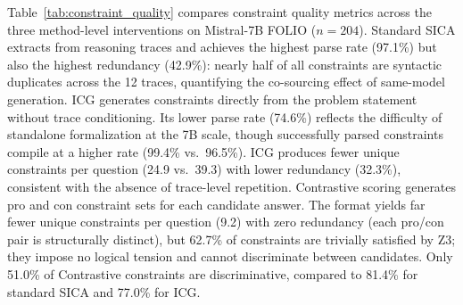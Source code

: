 Table~\ref{tab:constraint_quality} compares constraint quality metrics across the three method-level interventions on Mistral-7B FOLIO ($n = 204$). Standard SICA extracts from reasoning traces and achieves the highest parse rate (97.1\%) but also the highest redundancy (42.9\%): nearly half of all constraints are syntactic duplicates across the 12 traces, quantifying the co-sourcing effect of same-model generation. ICG generates constraints directly from the problem statement without trace conditioning. Its lower parse rate (74.6\%) reflects the difficulty of standalone formalization at the 7B scale, though successfully parsed constraints compile at a higher rate (99.4\% vs.\ 96.5\%). ICG produces fewer unique constraints per question (24.9 vs.\ 39.3) with lower redundancy (32.3\%), consistent with the absence of trace-level repetition. Contrastive scoring generates pro and con constraint sets for each candidate answer. The format yields far fewer unique constraints per question (9.2) with zero redundancy (each pro/con pair is structurally distinct), but 62.7\% of constraints are trivially satisfied by Z3; they impose no logical tension and cannot discriminate between candidates. Only 51.0\% of Contrastive constraints are discriminative, compared to 81.4\% for standard SICA and 77.0\% for ICG.

\begin{table}[h]
\centering
\small
\caption{Constraint quality metrics across method-level interventions (Mistral-7B, FOLIO, $n = 204$). Parse: fraction of extraction attempts yielding valid JSON. Z3 Compile: fraction compiling to Z3 formulas. Unique/q: mean unique constraints per question. Redundancy: fraction of constraints duplicated across traces. Disc.: fraction discriminative (different Z3 outcome per candidate). Triv.\ Sat.: fraction trivially satisfied (no logical tension).}
\label{tab:constraint_quality}
\end{table}

